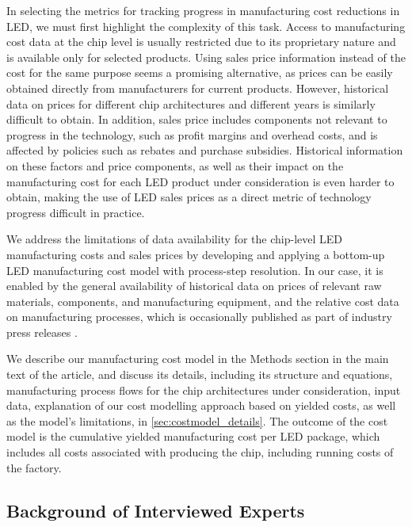\documentclass[parskip=full]{article}
\begin{document}
In selecting the metrics for tracking progress in manufacturing cost reductions in LED, we must first highlight the complexity of this task. Access to manufacturing cost data at the chip level is usually restricted due to its proprietary nature and is available only for selected products. Using sales price information instead of the cost for the same purpose seems a promising alternative, as prices can be easily obtained directly from manufacturers for current products. However, historical data on prices for different chip architectures and different years is similarly difficult to obtain. In addition, sales price includes components not relevant to progress in the technology, such as profit margins and overhead costs, and is affected by policies such as rebates and purchase subsidies. Historical information on these factors and price components, as well as their impact on the manufacturing cost for each LED product under consideration is even harder to obtain, making the use of LED sales prices as a direct metric of technology progress difficult in practice.

We address the limitations of data availability for the chip-level LED manufacturing costs and sales prices by developing and applying a bottom-up LED manufacturing cost model with process-step resolution. In our case, it is enabled by the general availability of historical data on prices of relevant raw materials, components, and manufacturing equipment, and the relative cost data on manufacturing processes, which is occasionally published as part of industry press releases \cite{ledinside2013csp}\cite{seoul2015csp}. 

We describe our manufacturing cost model in the Methods section in the main text of the article, and discuss its details, including its structure and equations, manufacturing process flows for the chip architectures under consideration, input data, explanation of our cost modelling approach based on yielded costs, as well as the model’s limitations, in \cref{sec:costmodel_details}. The outcome of the cost model is the cumulative yielded manufacturing cost per LED package, which includes all costs associated with producing the chip, including running costs of the factory.

\clearpage

\subsection{Background of Interviewed Experts}
\end{document}
